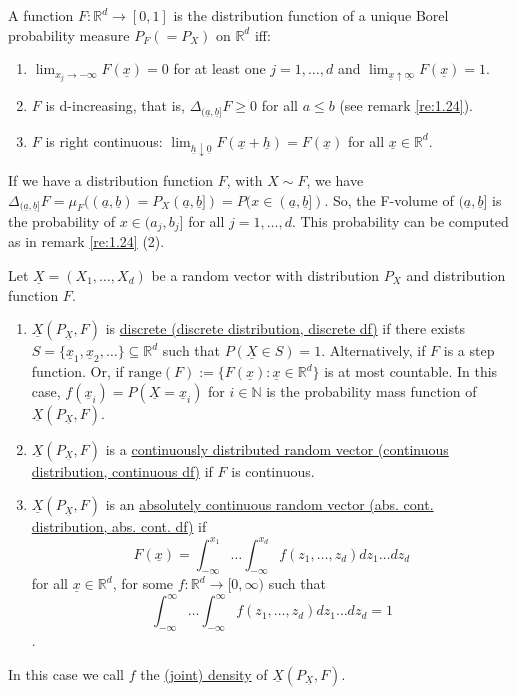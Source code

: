 \documentclass{article}
\newcommand{\R}{\mathbb{R}}
\newcommand{\N}{\mathbb{N}}
\begin{document}
	\begin{mythm}{}{}
		A function $F : \R^d\to[0, 1]$ is the distribution function of a unique Borel probability measure $P_F(=P_X)$ on $\R^d$ iff:
		\begin{enumerate}[label=(\roman*)]
			\item $\lim_{x_j\to-\infty}F(\underline{x})=0$ for at least one $j=1, \dots, d$ and $\lim_{\underline{x}\uparrow\underline{\infty}}F(\underline{x})=1$.
			
			\item $F$ is d-increasing, that is, $\Delta_{(\underline{a}, \underline{b}]}F\geq0$ for all $a\leq b$ (see remark \ref{re:1.24}).
			
			\item $F$ is right continuous: $\lim_{\underline{h}\downarrow\underline{0}}F(\underline{x}+\underline{h})=F(\underline{x})$ for all $\underline{x}\in\R^d$.
		\end{enumerate}
		
		If we have a distribution function $F$, with $X\sim F$, we have $\Delta_{(\underline{a}, \underline{b}]}F=\mu_F((\underline{a}, \underline{b})=P_X(\underline{a}, \underline{b}])=P(x\in(\underline{a}, \underline{b}])$. So, the F-volume of $(\underline{a}, \underline{b}]$ is the probability of $x\in(a_j, b_j]$ for all $j=1, \dots, d$. This probability can be computed as in remark \ref{re:1.24} (2).
	\end{mythm}
	
	\begin{mydef}{}{}
		Let $\underline{X}=(X_1, \dots, X_d)$ be a random vector with distribution $P_X$ and distribution function $F$.
		\begin{enumerate}
			\item $\underline{X}(P_{\underline{X}}, F)$ is \ul{discrete (discrete distribution, discrete df)} if there exists $S=\{\underline{x}_1, \underline{x}_2, \dots\}\subseteq \R^d$ such that $P(\underline{X}\in S)=1$. Alternatively, if $F$ is a step function. Or, if $\mbox{range}(F):=\{F(\underline{x}) : \underline{x}\in \R^d\}$ is at most countable. In this case, $f(\underline{x}_i)=P(\underline{X}=\underline{x}_i)$ for $i\in\N$ is the probability mass function of $\underline{X}(P_{\underline{X}}, F)$.
			
			\item $\underline{X}(P_{\underline{X}}, F)$ is a \ul{continuously distributed random vector (continuous distribution, continuous df)} if $F$ is continuous.
			
			\item $\underline{X}(P_{\underline{X}}, F)$ is an \ul{absolutely continuous random vector (abs. cont. distribution, abs. cont. df)} if $$F(\underline{x})=\int_{-\infty}^{x_1}\dots\int_{-\infty}^{x_d}f(z_1, \dots, z_d)dz_1\dots dz_d$$ for all $\underline{x}\in\R^d$, for some $f : \R^d\to[0, \infty)$ such that $$\int_{-\infty}^{\infty}\dots\int_{-\infty}^{\infty}f(z_1, \dots, z_d)dz_1\dots dz_d=1$$.				\end{enumerate}
			
		In this case we call $f$ the \ul{(joint) density} of $\underline{X}(P_{\underline{X}}, F)$.
	\end{mydef}
	
\end{document}
